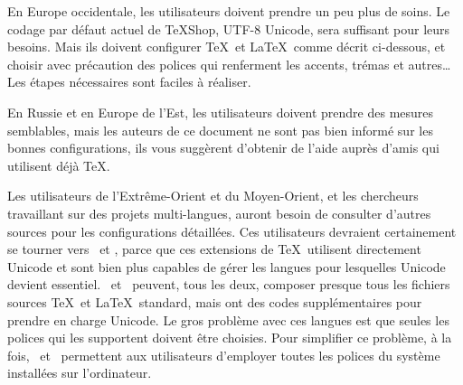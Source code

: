 \documentclass[11pt,french]{article}
\newcommand{\TS}{\textsf{\TeX Shop}}
\newcommand{\acr}[1]{\textsf{#1}}
\newcommand{\cmd}[1]{\textsf{#1}}
\begin{document}
En Europe occidentale, les utilisateurs doivent prendre un peu plus de soins. Le codage par défaut actuel de \TS, \acr{UTF-8 Unicode}, sera suffisant pour leurs besoins. Mais ils doivent configurer \TeX\ et \LaTeX\ comme décrit ci-dessous, et choisir avec précaution des polices qui renferment les accents, trémas et autres… Les étapes nécessaires sont faciles à réaliser.

En Russie et en Europe de l'Est, les utilisateurs doivent prendre des mesures semblables, mais les auteurs de ce document ne sont pas bien informé sur les bonnes configurations, ils vous suggèrent d'obtenir de l'aide auprès d'amis qui utilisent déjà \TeX.

Les utilisateurs de l'Extrême-Orient et du Moyen-Orient, et les chercheurs travaillant sur des projets multi-langues, auront besoin de consulter d'autres sources pour les configurations détaillées. Ces utilisateurs devraient certainement se tourner vers \XeTeX\ et \LuaTeX, parce que ces extensions de \TeX\ utilisent directement \cmd{Unicode} et sont bien plus capables de gérer les langues pour lesquelles \cmd{Unicode} devient essentiel. \XeTeX\ et \LuaTeX\ peuvent, tous les deux, composer presque tous les fichiers sources \TeX\ et \LaTeX\ standard, mais ont des codes supplémentaires pour prendre en charge \cmd{Unicode}. Le gros problème avec ces langues est que seules les polices qui les supportent doivent être choisies. Pour simplifier ce problème, à la fois, \XeTeX\ et \LuaTeX\ permettent aux utilisateurs d'employer toutes les polices du système installées sur l'ordinateur.
\end{document}
